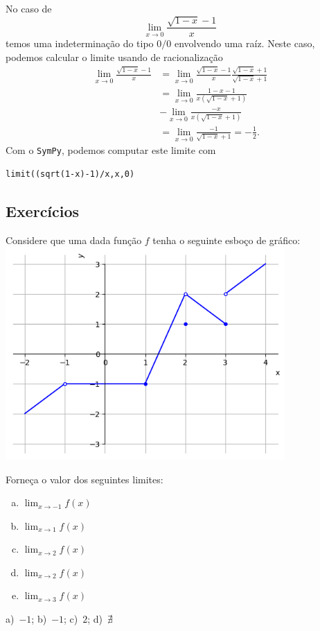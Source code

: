 \begin{ex}
  No caso de
  \begin{equation}
    \lim_{x\to 0} \frac{\sqrt{1-x}-1}{x}
  \end{equation}
  temos uma indeterminação do tipo $0/0$ envolvendo uma raíz. Neste caso, podemos calcular o limite usando de racionalização
  \begin{align}
    \lim_{x\to 0} \frac{\sqrt{1-x}-1}{x} &= \lim_{x\to 0} \frac{\sqrt{1-x}-1}{x}\frac{\sqrt{1-x}+1}{\sqrt{1-x}+1}\\
                                         &= \lim_{x\to 0} \frac{1-x-1}{x(\sqrt{1-x}+1)} \\
                                         &- \lim_{x\to 0} \frac{-x}{x(\sqrt{1-x}+1)}\\
    &= \lim_{x\to 0} \frac{-1}{\sqrt{1-x}+1} = -\frac{1}{2}.
  \end{align}
  \ifispython
  Com o \verb+SymPy+, podemos computar este limite com
\begin{verbatim}
limit((sqrt(1-x)-1)/x,x,0)
\end{verbatim}
  \fi
\end{ex}

\subsection*{Exercícios}

\begin{exer}\label{exer:limgraf}
  Considere que uma dada função $f$ tenha o seguinte esboço de gráfico:
  \includegraphics[width=0.8\textwidth]{./cap_lim/dados/fig_exer_limgraf/fig_exer_limgraf}

  Forneça o valor dos seguintes limites:
  \begin{enumerate}[a)]
  \item $\displaystyle \lim_{x\to -1} f(x)$
  \item $\displaystyle \lim_{x\to 1} f(x)$
  \item $\displaystyle \lim_{x\to 2} f(x)$
  \item $\displaystyle \lim_{x\to 2} f(x)$
  \item $\displaystyle \lim_{x\to 3} f(x)$
  \end{enumerate}
\end{exer}
\begin{resp}
  a)~$-1$; b)~$-1$; c)~$2$; d)~$\nexists$
\end{resp}

